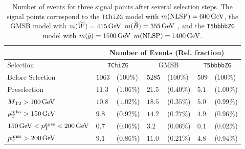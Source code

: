 \begin{table}[h!]
 \centering
 \caption{Number of events for three signal points after several selection steps. The signal points correspond to the \texttt{TChiZG} model with $m(\mathrm{NLSP})=600\,\text{Ge\hspace{-.08em}V}$, the GMSB model with $m(\widetilde{W})=415\,\text{Ge\hspace{-.08em}V}$ $m(\widetilde{B})=355\,\text{Ge\hspace{-.08em}V}$ , and the \texttt{T5bbbbZG} model with $m(\tilde{g})=1500\,\text{Ge\hspace{-.08em}V}$ $m(\mathrm{NLSP})=1400\,\text{Ge\hspace{-.08em}V}$.}
 \normalsize
 \label{tab:cutflow}
 \begin{tabular}{lllllll}
                            & \multicolumn{6}{c}{Number of Events (Rel. fraction)}                                                                                                      \\\hline
  Selection                 & \multicolumn{2}{c}{\texttt{TChiZG}}                  & \multicolumn{2}{c}{GMSB} & \multicolumn{2}{c}{\texttt{T5bbbbZG}}                                   \\\hline
  Before Selection          & $1063$                                               & ($100\%$)                & $5285$                                & ($100\%$)  & $509$ & ($100\%$)  \\
  Preselection              & $11.3$                                               & ($1.06\% $)              & $21.5$                                & ($0.40\%$) & $5.1$ & ($1.00\%$) \\
  $M_{\mathrm{T2}}>100\,\text{Ge\hspace{-.08em}V}$          & $10.8$                                               & ($1.02\%$)               & $18.5$                                & ($0.35\%$) & $5.0$ & ($0.99\%$) \\
  $p_{\mathrm{T}}^\text{miss}>150\,\text{Ge\hspace{-.08em}V}$         & $9.8$                                                & ($0.92\%$)               & $14.2$                                & ($0.27\%$) & $4.9$ & ($0.96\%$) \\\hline
  $150\,\text{Ge\hspace{-.08em}V}<p_{\mathrm{T}}^\text{miss}<200\,\text{Ge\hspace{-.08em}V}$ & $0.7$                                                & ($0.06\%$)               & $3.2$                                 & ($0.06\%$) & $0.1$ & ($0.02\%$) \\
  $p_{\mathrm{T}}^\text{miss}>200\,\text{Ge\hspace{-.08em}V}$         & $9.1$                                                & ($0.86\%$)               & $11.0$                                & ($0.21\%$) & $4.8$ & ($0.94\%$) 
 \end{tabular}
 \vspace{\baselineskip}
\end{table}


